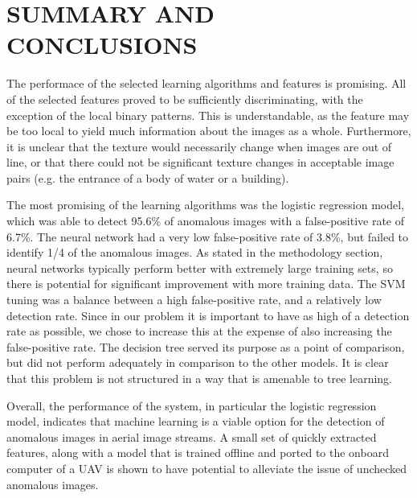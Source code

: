 %
%
%



\chapter{SUMMARY AND CONCLUSIONS \label{cha:Summary}}

The performace of the selected learning algorithms and features is promising.
All of the selected features proved to be sufficiently discriminating, with the exception of the local binary patterns.
This is understandable, as the feature may be too local to yield much information about the images as a whole.
Furthermore, it is unclear that the texture would necessarily change when images are out of line, or that there could not be significant texture changes in acceptable image pairs (e.g. the entrance of a body of water or a building).

The most promising of the learning algorithms was the logistic regression model, which was able to detect 95.6\% of anomalous images with a false-positive rate of 6.7\%.
The neural network had a very low false-positive rate of 3.8\%, but failed to identify 1/4 of the anomalous images.
As stated in the methodology section, neural networks typically perform better with extremely large training sets, so there is potential for significant improvement with more training data.
The SVM tuning was a balance between a high false-positive rate, and a relatively low detection rate.
Since in our problem it is important to have as high of a detection rate as possible, we chose to increase this at the expense of also increasing the false-positive rate.
The decision tree served its purpose as a point of comparison, but did not perform adequately in comparison to the other models.
It is clear that this problem is not structured in a way that is amenable to tree learning.

Overall, the performance of the system, in particular the logistic regression model, indicates that machine learning is a viable option for the detection of anomalous images in aerial image streams.
A small set of quickly extracted features, along with a model that is trained offline and ported to the onboard computer of a UAV is shown to have potential to alleviate the issue of unchecked anomalous images.



